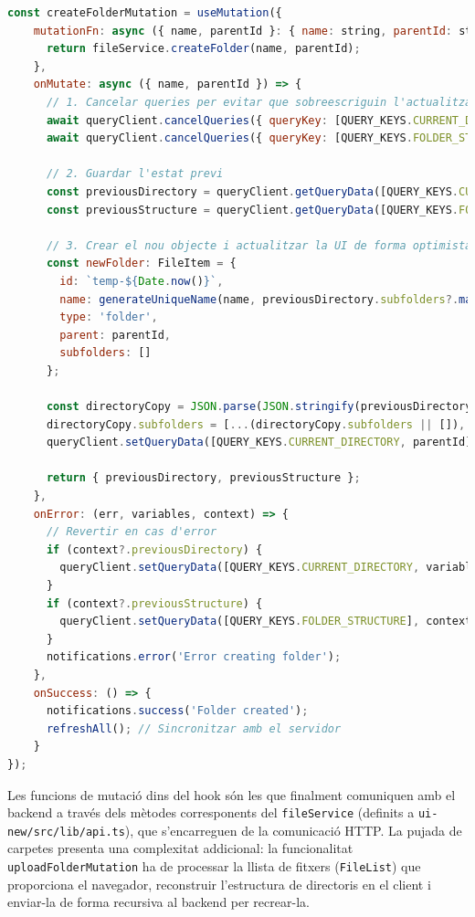 \begin{lstlisting}[language=javascript, caption={Implementacio d'una mutacio optimista a `useFileOperations.ts`}]
const createFolderMutation = useMutation({
    mutationFn: async ({ name, parentId }: { name: string, parentId: string }) => {
      return fileService.createFolder(name, parentId);
    },
    onMutate: async ({ name, parentId }) => {
      // 1. Cancelar queries per evitar que sobreescriguin l'actualitzacio optimista
      await queryClient.cancelQueries({ queryKey: [QUERY_KEYS.CURRENT_DIRECTORY, parentId] });
      await queryClient.cancelQueries({ queryKey: [QUERY_KEYS.FOLDER_STRUCTURE] });
      
      // 2. Guardar l'estat previ
      const previousDirectory = queryClient.getQueryData([QUERY_KEYS.CURRENT_DIRECTORY, parentId]) as FileItem;
      const previousStructure = queryClient.getQueryData([QUERY_KEYS.FOLDER_STRUCTURE]);
      
      // 3. Crear el nou objecte i actualitzar la UI de forma optimista
      const newFolder: FileItem = {
        id: `temp-${Date.now()}`,
        name: generateUniqueName(name, previousDirectory.subfolders?.map((f: FileItem) => f.name) || [], name, true),
        type: 'folder',
        parent: parentId,
        subfolders: []
      };

      const directoryCopy = JSON.parse(JSON.stringify(previousDirectory));
      directoryCopy.subfolders = [...(directoryCopy.subfolders || []), newFolder];
      queryClient.setQueryData([QUERY_KEYS.CURRENT_DIRECTORY, parentId], directoryCopy);
      
      return { previousDirectory, previousStructure };
    },
    onError: (err, variables, context) => {
      // Revertir en cas d'error
      if (context?.previousDirectory) {
        queryClient.setQueryData([QUERY_KEYS.CURRENT_DIRECTORY, variables.parentId], context.previousDirectory);
      }
      if (context?.previousStructure) {
        queryClient.setQueryData([QUERY_KEYS.FOLDER_STRUCTURE], context.previousStructure);
      }
      notifications.error('Error creating folder');
    },
    onSuccess: () => {
      notifications.success('Folder created');
      refreshAll(); // Sincronitzar amb el servidor
    }
});
\end{lstlisting}

Les funcions de mutació dins del hook són les que finalment comuniquen amb el backend a través dels mètodes corresponents del \texttt{fileService} (definits a \texttt{ui-new/src/lib/api.ts}), que s'encarreguen de la comunicació HTTP. La pujada de carpetes presenta una complexitat addicional: la funcionalitat \texttt{uploadFolderMutation} ha de processar la llista de fitxers (\texttt{FileList}) que proporciona el navegador, reconstruir l'estructura de directoris en el client i enviar-la de forma recursiva al backend per recrear-la.

